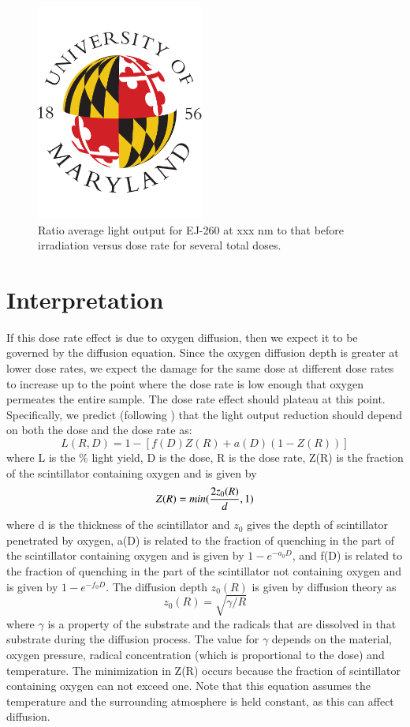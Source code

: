 \documentclass[review]{elsarticle}
\begin{document}
\begin{figure}[!ht]
\begin{center}
\includegraphics[width=0.49\textwidth]{./figures/placeholder.pdf}
\caption{
Ratio average light output for EJ-260 at {\color{red} xxx nm} to that before irradiation versus dose rate for several total doses.
}
\label{fig:fig3}
\end{center}
\end{figure}



\section{Interpretation}


If this dose rate effect is due to oxygen diffusion, then
we expect it to be governed by the diffusion equation.  Since
the oxygen diffusion depth is greater at lower dose rates,
we expect the damage for the same dose at different dose rates to
increase up to the point where the dose rate is low enough that oxygen
permeates the entire sample.  The dose rate effect should plateau
at this point.  Specifically, we predict (following \cite{Wick1991472}) that the light output
reduction should depend on both the dose and the dose rate as:
$$ L(R,D) = 1 - [f(D)Z(R) + a(D)(1-Z(R))]$$
where L is the \% light yield, D is the dose, R is the dose rate, 
Z(R) is the fraction of the scintillator containing 
oxygen and is given by
$$Z(R)=min({{2 z_0(R)}\over{d}},1)$$
where d is the thickness of the scintillator and $z_0$ gives
the depth of scintillator penetrated by oxygen,
a(D) is related to the fraction of quenching in the part of
the scintillator containing oxygen and is given by $1-e^{-a_0 D}$, 
and
f(D) is related to the fraction of quenching in the part of
the scintillator not containing oxygen and is given by $1-e^{-f_0 D}$.
The diffusion depth $z_0(R)$ is given by diffusion theory as
$$z_0(R)=\sqrt{\gamma/R}$$
where $\gamma$ is a property of the substrate and the radicals that
are dissolved in that substrate during the diffusion process.
The value for $\gamma$ depends on the material, oxygen pressure,
radical concentration (which is proportional to the dose) and 
temperature.
The minimization in Z(R) occurs because the fraction of scintillator
containing oxygen can not exceed one.  Note that this equation 
assumes the temperature and the surrounding atmosphere
is held constant, as this can 
affect diffusion.
\end{document}
